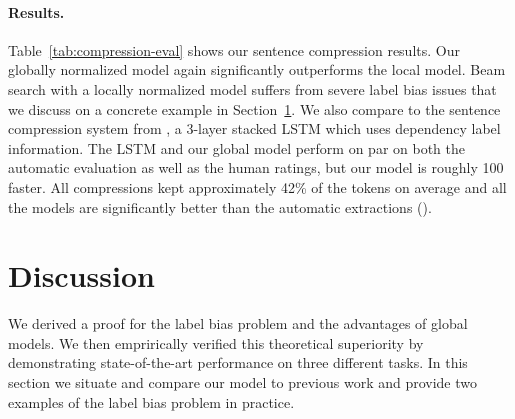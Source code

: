 \documentclass[11pt]{article}
\begin{document}
\begin{table}
  \centering {}
  \caption{\label{tab:compression-eval}
    Sentence compression results on News data.
{\em Automatic} refers to application of the same automatic extraction rules used to generate
    the News training corpus.
  }
\end{table}

\paragraph{Results.}

Table~\ref{tab:compression-eval} shows our sentence compression results.
Our globally normalized model again significantly outperforms the local model.
Beam search with a locally normalized model suffers from severe label bias issues
that we discuss on a concrete example in Section~\ref{sec:discussion}.
We also compare to the sentence compression system
from , a 3-layer stacked LSTM which uses dependency
label information.
The LSTM and our global model perform on par on both the automatic evaluation
as well as the human ratings, but our model is roughly 100 faster.
All compressions kept approximately 42\% of the tokens on average and
all the models are significantly better than the automatic extractions ().

 
 \section{Discussion}
\label{sec:discussion}

We derived a 
proof for the label bias problem
and the advantages of global models.
We then emprirically verified this theoretical superiority
by demonstrating state-of-the-art performance on three
different tasks.
In this section we situate and compare our model to
previous work and provide two examples of the label bias problem
in practice.
\end{document}
